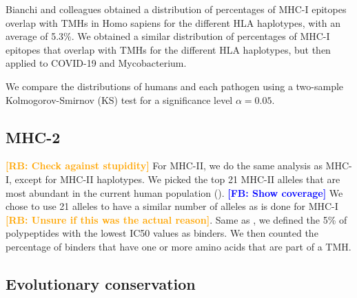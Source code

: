 \documentclass{article}
\newcommand{\frans}[1]{\textcolor{blue}{\textbf{[FB: #1]}}}
\newcommand{\richel}[1]{\textcolor{orange}{\textbf{[RB: #1]}}}
\begin{document}
Bianchi and colleagues obtained a distribution of 
percentages of MHC-I epitopes overlap with TMHs in Homo sapiens
for the different HLA haplotypes, with an average of 5.3\%.
We obtained a similar distribution of percentages of MHC-I epitopes that 
overlap with TMHs for the different HLA haplotypes, but then applied to
COVID-19 and Mycobacterium.

We compare the distributions of humans and each pathogen
using a two-sample Kolmogorov-Smirnov (KS) test
for a significance level $\alpha = 0.05$.

\subsection{MHC-2}

\richel{Check against stupidity}
For MHC-II, we do the same analysis as MHC-I, except for
MHC-II haplotypes. We picked the top 21 MHC-II alleles that are most abundant 
in the current human population (\cite{greenbaum2011functional}).
\frans{Show coverage}
We chose to use 21 alleles to have a similar number of alleles as is done
for MHC-I \richel{Unsure if this was the actual reason}.
Same as \cite{bianchi2017}, we defined the 5\% of polypeptides 
with the lowest IC50 values as binders. We then counted the percentage
of binders that have one or more amino acids that are part of a TMH.

\subsection{Evolutionary conservation}
\end{document}
